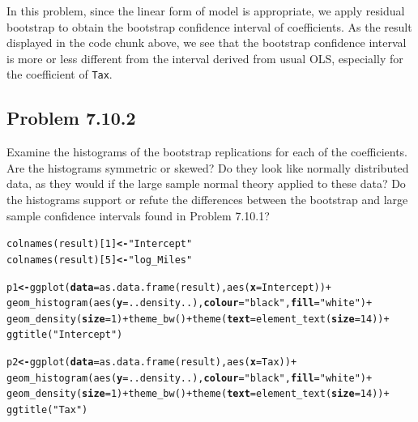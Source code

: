 \documentclass[12pt,oneside,a4paper]{article}\usepackage[]{graphicx}\usepackage[]{xcolor}
\makeatletter
\newcommand{\hlnum}[1]{\textcolor[rgb]{0,0,0}{#1}}%
\newcommand{\hlstr}[1]{\textcolor[rgb]{0,0,1}{#1}}%
\newcommand{\hlopt}[1]{\textcolor[rgb]{0,0,0}{#1}}%
\newcommand{\hlstd}[1]{\textcolor[rgb]{0,0,0}{#1}}%
\newcommand{\hlkwb}[1]{\textcolor[rgb]{0.498,0,0.333}{\textbf{#1}}}%
\newcommand{\hlkwc}[1]{\textcolor[rgb]{0.498,0,0.333}{\textbf{#1}}}%
\newcommand{\hlkwd}[1]{\textcolor[rgb]{0,0,0}{#1}}%
\newenvironment{kframe}{%
 \def\at@end@of@kframe{}%
 \ifinner\ifhmode%
  \def\at@end@of@kframe{\end{minipage}}%
  \begin{minipage}{\columnwidth}%
 \fi\fi%
 \def\FrameCommand##1{\hskip\@totalleftmargin \hskip-\fboxsep
 \colorbox{shadecolor}{##1}\hskip-\fboxsep
     \hskip-\linewidth \hskip-\@totalleftmargin \hskip\columnwidth}%
 \MakeFramed {\advance\hsize-\width
   \@totalleftmargin\z@ \linewidth\hsize
   \@setminipage}}%
 {\par\unskip\endMakeFramed%
 \at@end@of@kframe}
\newenvironment{knitrout}{}{} %
\newcommand{\subproblem}[1]
{
    \subsection*{Problem {#1}}
}
\newcommand{\m}[1]{\texttt{{#1}}}
\makeatother
\begin{document}
In this problem, since the linear form of model is appropriate, we apply residual bootstrap to obtain the bootstrap confidence interval of coefficients. As the result displayed in the code chunk above, we see that the bootstrap confidence interval is more or less different from the interval derived from usual OLS, especially for the coefficient of \m{Tax}.

\subproblem{7.10.2}
Examine the histograms of the bootstrap replications for each of the coefficients. Are the histograms symmetric or skewed? Do they look like normally distributed data, as they would if the large sample normal theory applied to these data? Do the histograms support or refute the differences between the bootstrap and large sample confidence intervals found in Problem 7.10.1?

\begin{knitrout}
\color{fgcolor}\begin{kframe}
\begin{alltt}
\hlkwd{colnames}\hlstd{(result)[}\hlnum{1}\hlstd{]} \hlkwb{<-} \hlstr{"Intercept"}
\hlkwd{colnames}\hlstd{(result)[}\hlnum{5}\hlstd{]} \hlkwb{<-} \hlstr{"log_Miles"}

\hlstd{p1} \hlkwb{<-} \hlkwd{ggplot}\hlstd{(}\hlkwc{data} \hlstd{=} \hlkwd{as.data.frame}\hlstd{(result),} \hlkwd{aes}\hlstd{(}\hlkwc{x} \hlstd{= Intercept))} \hlopt{+}
    \hlkwd{geom_histogram}\hlstd{(}\hlkwd{aes}\hlstd{(}\hlkwc{y} \hlstd{= ..density..),} \hlkwc{colour} \hlstd{=} \hlstr{"black"}\hlstd{,} \hlkwc{fill} \hlstd{=} \hlstr{"white"}\hlstd{)} \hlopt{+}
    \hlkwd{geom_density}\hlstd{(}\hlkwc{size} \hlstd{=} \hlnum{1}\hlstd{)} \hlopt{+} \hlkwd{theme_bw}\hlstd{()} \hlopt{+} \hlkwd{theme}\hlstd{(}\hlkwc{text} \hlstd{=} \hlkwd{element_text}\hlstd{(}\hlkwc{size} \hlstd{=} \hlnum{14}\hlstd{))} \hlopt{+}
    \hlkwd{ggtitle}\hlstd{(}\hlstr{"Intercept"}\hlstd{)}

\hlstd{p2} \hlkwb{<-} \hlkwd{ggplot}\hlstd{(}\hlkwc{data} \hlstd{=} \hlkwd{as.data.frame}\hlstd{(result),} \hlkwd{aes}\hlstd{(}\hlkwc{x} \hlstd{= Tax))} \hlopt{+}
    \hlkwd{geom_histogram}\hlstd{(}\hlkwd{aes}\hlstd{(}\hlkwc{y} \hlstd{= ..density..),} \hlkwc{colour} \hlstd{=} \hlstr{"black"}\hlstd{,} \hlkwc{fill} \hlstd{=} \hlstr{"white"}\hlstd{)} \hlopt{+}
    \hlkwd{geom_density}\hlstd{(}\hlkwc{size} \hlstd{=} \hlnum{1}\hlstd{)} \hlopt{+} \hlkwd{theme_bw}\hlstd{()} \hlopt{+} \hlkwd{theme}\hlstd{(}\hlkwc{text} \hlstd{=} \hlkwd{element_text}\hlstd{(}\hlkwc{size} \hlstd{=} \hlnum{14}\hlstd{))} \hlopt{+}
    \hlkwd{ggtitle}\hlstd{(}\hlstr{"Tax"}\hlstd{)}


\end{alltt}
\end{kframe}
\end{knitrout}
\end{document}
